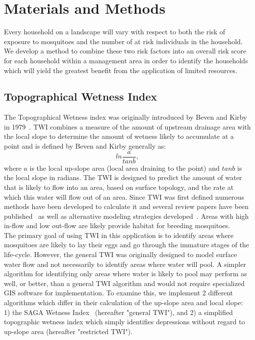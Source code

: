 \documentclass[10pt,letterpaper]{article}\usepackage[]{graphicx}\usepackage[]{color}
\begin{document}
\section*{Materials and Methods}%
Every household on a landscape will vary with respect to both the risk of exposure to mosquitoes and the number of at risk individuals in the household. We develop a method to combine these two risk factors into an overall risk score for each household within a management area in order to identify the households which will yield the greatest benefit from the application of limited resources.\\

\subsection{Topographical Wetness Index}

The Topographical Wetness index was originally introduced by Beven and Kirby in 1979~\cite{Beven1979}.  TWI combines a measure of the amount of upstream drainage area with the local slope to determine the amount of wetness likely to accumulate at a point and is defined by Beven and Kirby generally as:
$$ln\frac{a}{tanb},$$
where $a$ is the local up-slope area (local area draining to the point) and $tanb$ is the local slope in radians.  The TWI is designed to predict the amount of water that is likely to flow into an area, based on surface topology, and the rate at which this water will flow out of an area.  Since TWI was first defined numerous methods have been developed to calculate it and several review papers have been published~\cite{Quinn1995,Sorensen2006} as well as alternative modeling strategies developed~\cite{Grabs2009}.  Areas with high in-flow and low out-flow are likely provide habitat for breeding mosquitoes. \\

The primary goal of using TWI in this application is to identify areas where mosquitoes are likely to lay their eggs and go through the immature stages of the life-cycle.  However, the general TWI was originally designed to model surface water flow and not necessarily to identify areas where water will pool. A simpler algorithm for identifying only areas where water is likely to pool may perform as well, or better, than a general TWI algorithm and would not require specialized GIS software for implementation.  To examine this, we implement 2 different algorithms which differ in their calculation of the up-slope area and local slope: 1) the SAGA Wetness Index~\cite{Bohner2002} (hereafter "general TWI"), and 2) a simplified topographic wetness index which simply identifies depressions without regard to up-slope area (hereafter "restricted TWI").  \\
\end{document}
